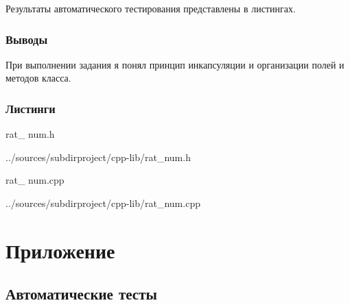 \documentclass[12pt,a4paper]{report}
\begin{document}
Результаты автоматического тестирования представлены в листингах.

\subsection{Выводы}

При выполнении задания я понял принцип инкапсуляции и организации полей и методов класса.

\subsection*{Листинги}
rat\_ num.h

{../sources/subdirproject/cpp-lib/rat_num.h}

\vspace{\baselineskip}

rat\_ num.cpp

{../sources/subdirproject/cpp-lib/rat_num.cpp}

\chapter {Приложение}

\section{Автоматические тесты}

	
	
	
	
\end{document}
